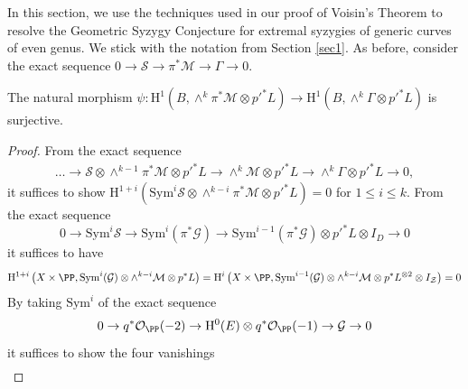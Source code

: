 \label{sec2}
In this section, we use the techniques used in our proof of Voisin's Theorem to resolve the Geometric Syzygy Conjecture for extremal syzygies of generic curves of even genus. We stick with the notation from Section \ref{sec1}.  As before, consider the exact sequence $0 \to \mathcal{S} \to \pi^* \mathcal{M} \to \Gamma \to 0.$
\begin{thm}
\notready \label{real-thm}
The natural morphism $\psi: \mathrm{H}^1(B, \wedge^k \pi^* \mathcal{M} \otimes {p'}^*L) \to \mathrm{H}^1(B, \wedge^k \Gamma \otimes {p'}^*L)$ is surjective.
\end{thm}
\begin{proof}
From the exact sequence
\begin{align*}
\ldots \to \mathcal{S} \otimes \wedge^{k-1} \pi^* \mathcal{M}   \otimes {p'}^*L \to \wedge^k  \mathcal{M}   \otimes {p'}^*L \to \wedge^k \Gamma \otimes {p'}^*L \to 0,
\end{align*}
it suffices to show $\mathrm{H}^{1+i}(\mathrm{Sym}^i \mathcal{S} \otimes \wedge^{k-i} \pi^* \mathcal{M} \otimes {p'}^*L)=0$
for $1 \leq i \leq k$. From the exact sequence
$$0 \to \mathrm{Sym}^{i} \mathcal{S} \to \mathrm{Sym}^i( \pi^*\mathcal{G}) \to \mathrm{Sym}^{i-1}(\pi^*\mathcal{G})\otimes {p'}^*L \otimes I_D \to 0$$
it suffices to have
\begin{align*}
\mathrm{H}^{1+i}\left(X \times \PP,\mathrm{Sym}^i (\mathcal{G}) \otimes \wedge^{k-i} \mathcal{M} \otimes {p}^*L\right)=\mathrm{H}^i\left(X \times \PP,\mathrm{Sym}^{i-1}(\mathcal{G})\otimes \wedge^{k-i}  \mathcal{M} \otimes {p}^*L^{\otimes 2} \otimes I_{\mathcal{Z}}\right)=0
\end{align*}
By taking $\mathrm{Sym}^i$ of the exact sequence
$$0 \to q^*\mathcal{O}_{\PP}(-2) \to \mathrm{H}^0(E) \otimes q^*\mathcal{O}_{\PP}(-1) \to \mathcal{G} \to 0$$
it suffices to show the four vanishings
{\small{\begin{align*}

\end{align*}}}
\end{proof}
